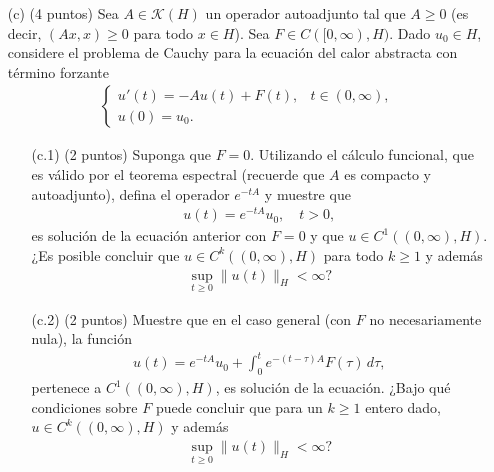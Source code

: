 \begin{enumerate}
  \item[(c)] (4 puntos) Sea $A \in \mathcal{K}(H)$ un operador autoadjunto tal que $A \geq 0$ (es decir, $(Ax,x) \geq 0$ para todo $x \in H$). Sea $F \in C([0,\infty), H)$. Dado $u_0 \in H$, considere el problema de Cauchy para la ecuación del calor abstracta con término forzante
  \begin{align*}
    \begin{cases}
      u'(t) = -Au(t) + F(t), & t \in (0,\infty), \\
      u(0) = u_0.
    \end{cases}
  \end{align*}
  \begin{enumerate}
    \item[(c.1)] (2 puntos) Suponga que $F = 0$. Utilizando el cálculo funcional, que es válido por el teorema espectral (recuerde que $A$ es compacto y autoadjunto), defina el operador $e^{-tA}$ y muestre que
    \begin{align*}
      u(t) = e^{-tA} u_0, \quad t > 0,
    \end{align*}
    es solución de la ecuación anterior con $F = 0$ y que $u \in C^1((0,\infty), H)$. ¿Es posible concluir que $u \in C^k((0,\infty), H)$ para todo $k \geq 1$ y además
    \begin{align*}
      \sup_{t \geq 0} \|u(t)\|_H < \infty?
    \end{align*}

    \item[(c.2)] (2 puntos) Muestre que en el caso general (con $F$ no necesariamente nula), la función
    \begin{align*}
      u(t) = e^{-tA} u_0 + \int_0^t e^{-(t - \tau)A} F(\tau)\, d\tau,
    \end{align*}
    pertenece a $C^1((0,\infty), H)$, es solución de la ecuación. ¿Bajo qué condiciones sobre $F$ puede concluir que para un $k \geq 1$ entero dado, $u \in C^k((0,\infty), H)$ y además
    \begin{align*}
      \sup_{t \geq 0} \|u(t)\|_H < \infty?
    \end{align*}
  \end{enumerate}
\end{enumerate}
